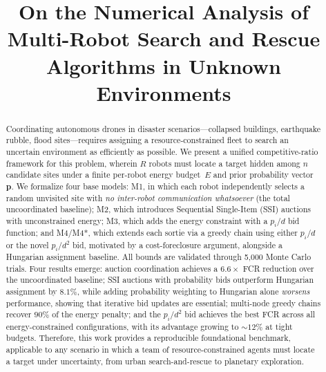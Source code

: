 \documentclass[conference]{IEEEtran}
\begin{document}
\title{On the Numerical Analysis of Multi-Robot Search and Rescue Algorithms in Unknown Environments}

\author{
\and
{}
}

\maketitle

\begin{abstract}
Coordinating autonomous drones in disaster scenarios---collapsed buildings,
earthquake rubble, flood sites---requires assigning a resource-constrained fleet
to search an uncertain environment as efficiently as possible.
We present a unified competitive-ratio framework for this problem, wherein $R$
robots must locate a target hidden among $n$ candidate sites under a finite
per-robot energy budget~$E$ and prior probability vector~$\mathbf{p}$.
We formalize four base models: M1, in which each robot independently selects a
random unvisited site with \emph{no inter-robot communication whatsoever} (the
total uncoordinated baseline); M2, which introduces Sequential Single-Item (SSI)
auctions with unconstrained energy; M3, which adds the energy constraint with a
$p_i/d$ bid function; and M4/M4*, which extends each sortie via a greedy chain
using either $p_i/d$ or the novel $p_i/d^2$ bid, motivated by a cost-foreclosure
argument, alongside a Hungarian assignment baseline.
All bounds are validated through 5,000 Monte Carlo trials.
Four results emerge: auction coordination achieves a $6.6\times$ FCR reduction
over the uncoordinated baseline; SSI auctions with probability bids outperform
Hungarian assignment by $8.1\%$, while adding probability weighting to Hungarian
alone \emph{worsens} performance, showing that iterative bid updates are essential;
multi-node greedy chains recover $90\%$ of the energy penalty; and the $p_i/d^2$
bid achieves the best FCR across all energy-constrained configurations, with its
advantage growing to ${\sim}12\%$ at tight budgets.
Therefore, this work provides a reproducible foundational benchmark, applicable to
any scenario in which a team of resource-constrained agents must locate a target
under uncertainty, from urban search-and-rescue to planetary exploration.
\end{abstract}
\end{document}
